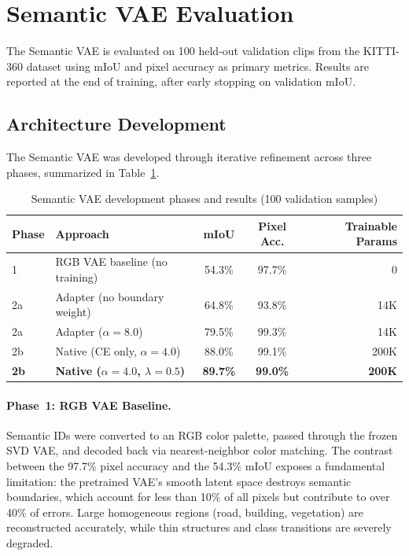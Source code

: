 \FloatBarrier
\section{Semantic VAE Evaluation}
\label{sec:vae_results}

The Semantic VAE is evaluated on 100 held-out validation clips from the KITTI-360 dataset using mIoU and pixel accuracy as primary metrics. Results are reported at the end of training, after early stopping on validation mIoU.

\subsection{Architecture Development}
\label{subsec:vae_phases}

The Semantic VAE was developed through iterative refinement across three phases, summarized in Table~\ref{tab:vae_phases}.

\begin{table}[t]
    \centering
    \caption{Semantic VAE development phases and results (100 validation samples)}
    \label{tab:vae_phases}
    \begin{tabular}{llccr}
        \toprule
        \textbf{Phase} & \textbf{Approach} & \textbf{mIoU} & \textbf{Pixel Acc.} & \textbf{Trainable Params} \\
        \midrule
        1 & RGB VAE baseline (no training) & 54.3\% & 97.7\% & 0 \\
        2a & Adapter (no boundary weight) & 64.8\% & 93.8\% & 14K \\
        2a & Adapter ($\alpha=8.0$) & 79.5\% & 99.3\% & 14K \\
        2b & Native (CE only, $\alpha=4.0$) & 88.0\% & 99.1\% & 200K \\
        \textbf{2b} & \textbf{Native ($\alpha=4.0$, $\lambda=0.5$)} & \textbf{89.7\%} & \textbf{99.0\%} & \textbf{200K} \\
        \bottomrule
    \end{tabular}
\end{table}

\paragraph{Phase~1: RGB VAE Baseline.}
Semantic IDs were converted to an RGB color palette, passed through the frozen SVD VAE, and decoded back via nearest-neighbor color matching. The contrast between the 97.7\% pixel accuracy and the 54.3\% mIoU exposes a fundamental limitation: the pretrained VAE's smooth latent space destroys semantic boundaries, which account for less than 10\% of all pixels but contribute to over 40\% of errors. Large homogeneous regions (road, building, vegetation) are reconstructed accurately, while thin structures and class transitions are severely degraded.

